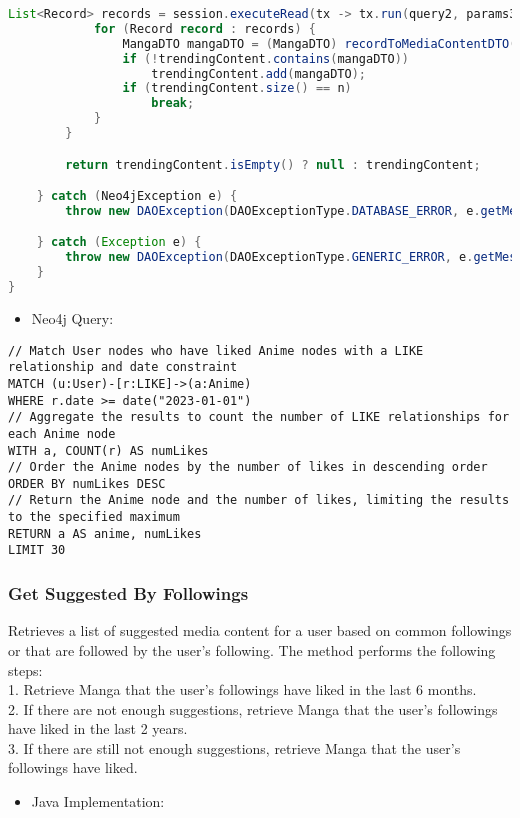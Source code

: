 \begin{mdframed}[style=customstyle]
\begin{lstlisting}[language=java]
            List<Record> records = session.executeRead(tx -> tx.run(query2, params3).list());
            for (Record record : records) {
                MangaDTO mangaDTO = (MangaDTO) recordToMediaContentDTO(record);
                if (!trendingContent.contains(mangaDTO))
                    trendingContent.add(mangaDTO);
                if (trendingContent.size() == n)
                    break;
            }
        }

        return trendingContent.isEmpty() ? null : trendingContent;

    } catch (Neo4jException e) {
        throw new DAOException(DAOExceptionType.DATABASE_ERROR, e.getMessage());

    } catch (Exception e) {
        throw new DAOException(DAOExceptionType.GENERIC_ERROR, e.getMessage());
    }
}\end{lstlisting}
\end{mdframed}

\begin{itemize}
    \item Neo4j Query:
\end{itemize}

\begin{mdframed}[style=customstyle2]
\begin{lstlisting}[language=Cypher, backgroundcolor=\color{white}]
// Match User nodes who have liked Anime nodes with a LIKE relationship and date constraint
MATCH (u:User)-[r:LIKE]->(a:Anime)
WHERE r.date >= date("2023-01-01")
// Aggregate the results to count the number of LIKE relationships for each Anime node
WITH a, COUNT(r) AS numLikes
// Order the Anime nodes by the number of likes in descending order
ORDER BY numLikes DESC
// Return the Anime node and the number of likes, limiting the results to the specified maximum
RETURN a AS anime, numLikes
LIMIT 30\end{lstlisting}
\end{mdframed}


\subsubsection*{Get Suggested By Followings}

Retrieves a list of suggested media content for a user based on common followings
or that are followed by the user's following.
The method performs the following steps:\\
1. Retrieve Manga that the user's followings have liked in the last 6 months.\\
2. If there are not enough suggestions, retrieve Manga that the user's followings have liked in the last 2 years.\\
3. If there are still not enough suggestions, retrieve Manga that the user's followings have liked.
\begin{itemize}
    \item Java Implementation:
\end{itemize}

